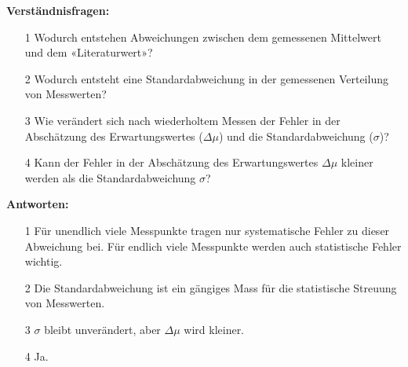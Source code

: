 \begin{tcolorbox}[enhanced,width=6in,
    fontupper=\small,drop fuzzy shadow southwest,
    colframe=black!50!black,colback=black!5]
\textbf{Verständnisfragen:} \\
\begin{enumerate}
\item[1] Wodurch entstehen Abweichungen zwischen dem
gemessenen Mittelwert und dem «Literaturwert»?
\item[2] Wodurch entsteht eine Standardabweichung in der
gemessenen Verteilung von Messwerten?
\item[3] Wie verändert sich nach wiederholtem Messen der Fehler in der
Abschätzung des Erwartungswertes ($\Delta\mu$) und die Standardabweichung ($\sigma$)?
\item[4] Kann der Fehler in der Abschätzung des Erwartungswertes $\Delta\mu$ kleiner werden als die Standardabweichung $\sigma$?
\end{enumerate}
\end{tcolorbox}

\begin{tcolorbox}[enhanced,width=6in,
    fontupper=\small,drop fuzzy shadow southwest,
    colframe=black!50!black,colback=black!5]
\textbf{Antworten:} \\
\begin{enumerate}
\item[1] Für unendlich viele Messpunkte tragen nur
systematische Fehler zu dieser Abweichung bei. Für
endlich viele Messpunkte werden auch statistische
Fehler wichtig.
\item[2] Die Standardabweichung ist ein gängiges Mass für die
statistische Streuung von Messwerten.
\item[3] $\sigma$ bleibt unverändert, aber $\Delta \mu $ wird kleiner. 
\item[4] Ja.
\end{enumerate}
\end{tcolorbox}